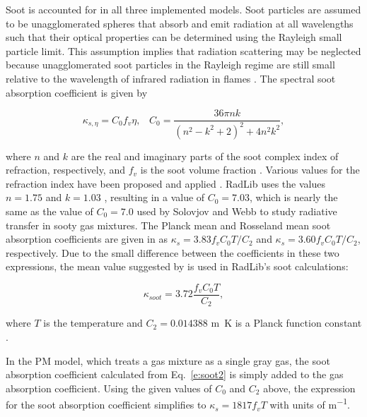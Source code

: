 \documentclass[preprint,12pt]{elsarticle}
\begin{document}
    Soot is accounted for in all three implemented models. Soot particles are assumed to be unagglomerated spheres that absorb and emit radiation at all wavelengths such that their optical properties can be determined using the Rayleigh small particle limit. This assumption implies that radiation scattering may be neglected because unagglomerated soot particles in the Rayleigh regime are still small relative to the wavelength of infrared radiation in flames \cite{Brewster_1992,Solovjov_2001}. The spectral soot absorption coefficient is given by
%
    \begin{linenomath}
        \begin{equation}
            \label{e:soot1}
            \kappa_{s,\eta}=C_0 f_v \eta, \; \; \; C_0 = \frac{36\pi n k}{(n^2-k^2+2)^2+4n^2k^2},
        \end{equation}
    \end{linenomath}
%
    where $n$ and $k$ are the real and imaginary parts of the soot complex index of refraction, respectively, and $f_v$ is the soot volume fraction \cite{Solovjov_2001,Modest_2013}. Various values for the refraction index have been proposed and applied \cite{Lee_1981,Stull_1960,Dalzell_1969,Howarth_1966,Chang_1990,Felske_1984,Williams_2007}.
    RadLib uses the values $n=1.75$ and $k=1.03$ \cite{Williams_2007}, resulting in a value of $C_0=7.03$, which is nearly the same as the value of $C_0=7.0$ used by Solovjov and Webb \cite{Solovjov_2001} to study radiative transfer in sooty gas mixtures.
    The Planck mean and Rosseland mean soot absorption coefficients are given in \cite{Modest_2013} as $\kappa_s=3.83f_vC_0T/C_2$ and $\kappa_s=3.60f_vC_0T/C_2$, respectively.
    Due to the small difference between the coefficients in these two expressions, the mean value suggested by \cite{Modest_2013,Felske_1977} is used in RadLib's soot calculations:
%
    \begin{linenomath}
        \begin{equation}
            \label{e:soot2}
            \kappa_{soot}=3.72\frac{f_vC_0T}{C_2},
        \end{equation}
    \end{linenomath}
%
    where $T$ is the temperature and $C_2=0.014388$ \si{m.K} is a Planck function constant \cite{Modest_2013}.

    In the PM model, which treats a gas mixture as a single gray gas, the soot absorption coefficient
    calculated from Eq.~\ref{e:soot2} is simply added to the gas absorption coefficient. Using the given values of $C_0$ and $C_2$ above, the expression for the soot absorption coefficient simplifies to  $\kappa_s=1817f_vT$ with units of \si{m^{-1}}.
\end{document}
